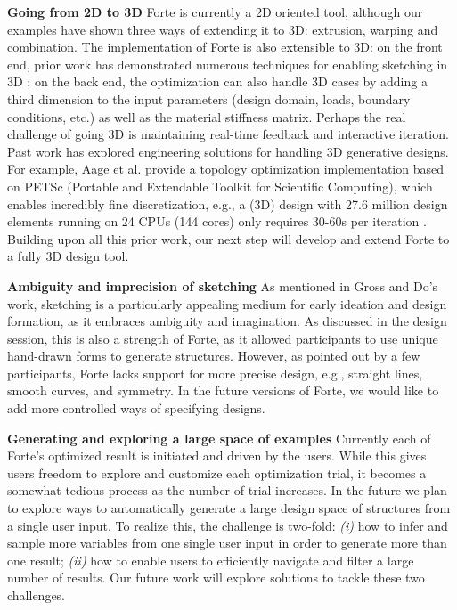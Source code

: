 \textbf{Going from 2D to 3D}
Forte is currently a 2D oriented tool, although our examples have shown three ways of extending it to 3D: extrusion, warping and combination. The implementation of Forte is also extensible to 3D: on the front end, prior work has demonstrated numerous techniques for enabling sketching in 3D \cite{igarashi2007teddy, bae2008ilovesketch, bae2009everybodylovessketch}; on the back end, the optimization can also handle 3D cases by adding a third dimension to the input parameters (design domain, loads, boundary conditions, etc.) as well as the material stiffness matrix. Perhaps the real challenge of going 3D is maintaining real-time feedback and interactive iteration. Past work has explored engineering solutions for handling 3D generative designs. For example, Aage et al. provide a topology optimization implementation based on PETSc (Portable and Extendable Toolkit for Scientific Computing), which enables incredibly fine discretization, e.g., a (3D) design with 27.6 million design elements running on 24 CPUs (144 cores) only requires 30-60s per iteration \cite{aage2014topology}. Building upon all this prior work, our next step will develop and extend Forte to a fully 3D design tool.

\textbf{Ambiguity and imprecision of sketching}
As mentioned in Gross and Do's work, sketching is a particularly appealing medium for early ideation and design formation, as it embraces ambiguity and imagination. As discussed in the design session, this is also a strength of Forte, as it allowed participants to use unique hand-drawn forms to generate structures. However, as pointed out by a few participants, Forte lacks support for more precise design, e.g., straight lines, smooth curves, and symmetry. In the future versions of Forte, we would like to add more controlled ways of specifying designs.

\textbf{Generating and exploring a large space of examples}
Currently each of Forte's optimized result is initiated and driven by the users. While this gives users freedom to explore and customize each optimization trial, it becomes a somewhat tedious process as the number of trial increases. In the future we plan to explore ways to automatically generate a large design space of structures from a single user input. To realize this, the challenge is two-fold: {\em(i)} how to infer and sample more variables from one single user input in order to generate more than one result; {\em(ii)} how to enable users to efficiently navigate and filter a large number of results. Our future work will explore solutions to tackle these two challenges.

